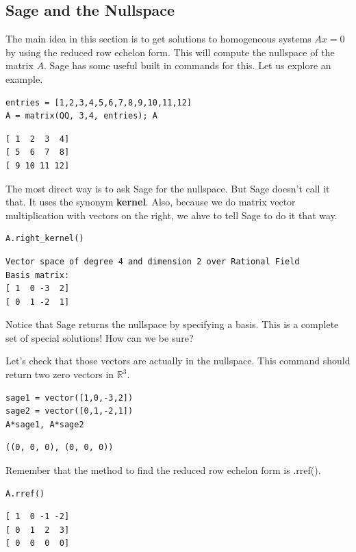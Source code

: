 \documentclass[10pt,]{book}
\newcommand{\terminology}[1]{\textbf{#1}}
\theoremstyle{plain}
\theoremstyle{definition}
\numberwithin{equation}{section}
\begin{document}
\subsection[Sage and the Nullspace]{Sage and the Nullspace}\label{subsection-66}

      The main idea in this section is to get solutions to homogeneous
      systems \(Ax=0\) by using the reduced row echelon form. This will
      compute the nullspace of the matrix \(A\). Sage has some useful built
      in commands for this. Let us explore an example.
\begin{lstlisting}[style=sageinput]
entries = [1,2,3,4,5,6,7,8,9,10,11,12]
A = matrix(QQ, 3,4, entries); A
\end{lstlisting}
\begin{lstlisting}[style=sageoutput]
[ 1  2  3  4]
[ 5  6  7  8]
[ 9 10 11 12]
\end{lstlisting}
\par

      The most direct way is to ask Sage for the nullspace. But Sage doesn't
      call it that. It uses the synonym \terminology{kernel}. Also, because we
      do matrix vector multiplication with vectors on the right, we ahve to
      tell Sage to do it that way.
\begin{lstlisting}[style=sageinput]
A.right_kernel()
\end{lstlisting}
\begin{lstlisting}[style=sageoutput]
Vector space of degree 4 and dimension 2 over Rational Field
Basis matrix:
[ 1  0 -3  2]
[ 0  1 -2  1]
\end{lstlisting}
\par

      Notice that Sage returns the nullspace by specifying a basis. This is
      a complete set of special solutions! How can we be sure?
\par

      Let's check that those vectors are actually in the nullspace. This command
      should return two zero vectors in \(\mathbb{R}^3\).
\begin{lstlisting}[style=sageinput]
sage1 = vector([1,0,-3,2])
sage2 = vector([0,1,-2,1])
A*sage1, A*sage2
\end{lstlisting}
\begin{lstlisting}[style=sageoutput]
((0, 0, 0), (0, 0, 0))
\end{lstlisting}
\par

      Remember that the method to find the reduced row
      echelon form is .rref().
\begin{lstlisting}[style=sageinput]
A.rref()
\end{lstlisting}
\begin{lstlisting}[style=sageoutput]
[ 1  0 -1 -2]
[ 0  1  2  3]
[ 0  0  0  0]
\end{lstlisting}
\par
\end{document}
